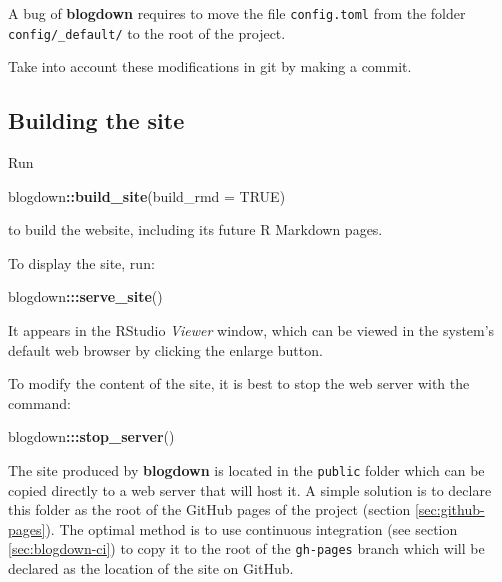 \documentclass[
  12pt,
  american,
  a4paper,
  extrafontsizes,onecolumn,openright
  ]{memoir}
\newenvironment{Shaded}{\begin{snugshade}}{\end{snugshade}}
\newcommand{\AttributeTok}[1]{\textcolor[rgb]{0.13,0.29,0.53}{#1}}
\newcommand{\ConstantTok}[1]{\textcolor[rgb]{0.56,0.35,0.01}{#1}}
\newcommand{\FunctionTok}[1]{\textcolor[rgb]{0.13,0.29,0.53}{\textbf{#1}}}
\newcommand{\NormalTok}[1]{#1}
\newcommand{\SpecialCharTok}[1]{\textcolor[rgb]{0.81,0.36,0.00}{\textbf{#1}}}
\begin{document}
A bug of \textbf{blogdown} requires to move the file \texttt{config.toml} from the folder \texttt{config/\_default/} to the root of the project.

Take into account these modifications in git by making a commit.

\subsection{Building the site}\label{building-the-site}

Run

\scriptsize

\begin{Shaded}
\begin{Highlighting}[]
\NormalTok{blogdown}\SpecialCharTok{::}\FunctionTok{build\_site}\NormalTok{(}\AttributeTok{build\_rmd =} \ConstantTok{TRUE}\NormalTok{)}
\end{Highlighting}
\end{Shaded}

\normalsize

to build the website, including its future R Markdown pages.

To display the site, run:

\scriptsize

\begin{Shaded}
\begin{Highlighting}[]
\NormalTok{blogdown}\SpecialCharTok{:::}\FunctionTok{serve\_site}\NormalTok{()}
\end{Highlighting}
\end{Shaded}

\normalsize

It appears in the RStudio \emph{Viewer} window, which can be viewed in the system's default web browser by clicking the enlarge button.

To modify the content of the site, it is best to stop the web server with the command:

\scriptsize

\begin{Shaded}
\begin{Highlighting}[]
\NormalTok{blogdown}\SpecialCharTok{:::}\FunctionTok{stop\_server}\NormalTok{()}
\end{Highlighting}
\end{Shaded}

\normalsize

The site produced by \textbf{blogdown} is located in the \texttt{public} folder which can be copied directly to a web server that will host it.
A simple solution is to declare this folder as the root of the GitHub pages of the project
(section \ref{sec:github-pages}).
The optimal method is to use continuous integration (see section \ref{sec:blogdown-ci}) to copy it to the root of the \texttt{gh-pages} branch which will be declared as the location of the site on GitHub.
\end{document}
